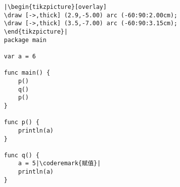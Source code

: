 \begin{lstlisting}[caption=全局作用域,label=src:scope2]
|\begin{tikzpicture}[overlay]
\draw [->,thick] (2.9,-5.00) arc (-60:90:2.00cm);
\draw [->,thick] (3.5,-7.00) arc (-60:90:3.15cm);
\end{tikzpicture}|
package main

var a = 6

func main() {
    p()
    q()
    p()
}

func p() {
    println(a)
}

func q() {
    a = 5|\coderemark{赋值}|
    println(a)
}
\end{lstlisting}
